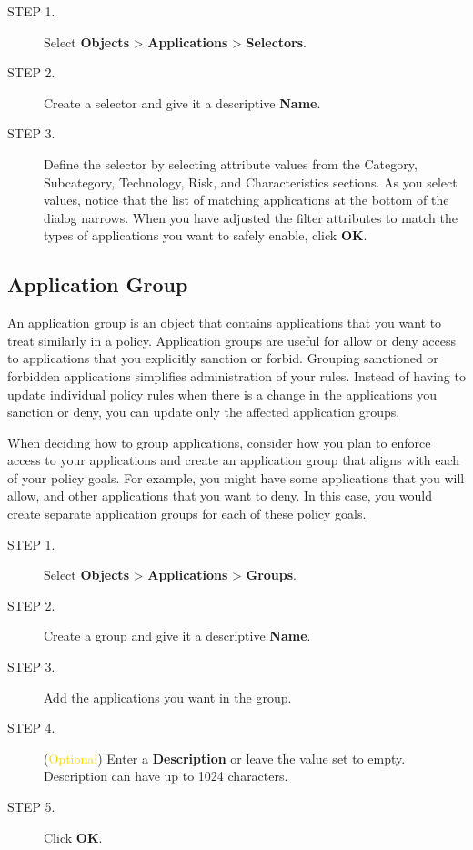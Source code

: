 \begin{description}
    \item[STEP 1.]	Select \textbf{Objects} > \textbf{Applications} > \textbf{Selectors}.
    \item[STEP 2.]	Create a selector and give it a descriptive \textbf{Name}.
    \item[STEP 3.]	Define the selector by selecting attribute values from the Category, Subcategory, Technology, Risk, and Characteristics sections. 
    As you select values, notice that the list of matching applications at the bottom of the dialog narrows. 
    When you have adjusted the filter attributes to match the types of applications you want to safely enable, click \textbf{OK}.
\end{description}

\subsection*{\hypertarget{link:Application Group}{Application Group}}
\label{sec:objects:application:group}

An application group is an object that contains applications that you want to treat similarly in a policy. Application groups are useful for allow or deny access to applications that you explicitly sanction or forbid. Grouping sanctioned or forbidden applications simplifies administration of your rules. Instead of having to update individual policy rules when there is a change in the applications you sanction or deny, you can update only the affected application groups.


When deciding how to group applications, consider how you plan to enforce access to your applications and create an application group that aligns with each of your policy goals. For example, you might have some applications that you will allow, and other applications that you want to deny. In this case, you would create separate application groups for each of these policy goals.

\begin{description}
    \item[STEP 1.]	Select \textbf{Objects} > \textbf{Applications} > \textbf{Groups}.
    \item[STEP 2.]	Create a group and give it a descriptive \textbf{Name}.
    \item[STEP 3.]	Add the applications you want in the group.
    \item[STEP 4.]	(\textcolor{gold}{Optional}) Enter a \textbf{Description} or leave the value set to empty. Description can have up to 1024 characters.
    \item[STEP 5.]	Click \textbf{OK}.    
\end{description}

